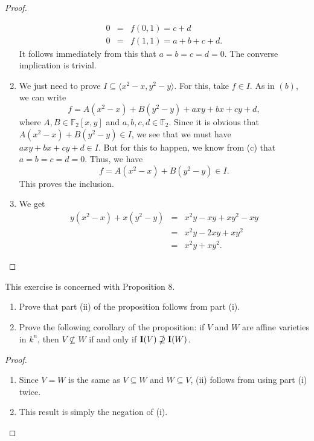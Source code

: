 \begin{proof}
\begin{enumerate}
\begin{eqnarray*}
            0 & = & f(0,1) = c+d\\
            0 & = & f(1,1) = a+b+c+d.
        \end{eqnarray*}
        It follows immediately from this that $a=b=c=d=0$. The converse implication is trivial.
        \item We just need to prove $I\subseteq \langle x^2 - x, y^2 - y\rangle$. For this, take $f\in I$. As in $(b)$, we can write
        $$f = A(x^2 - x) + B(y^2 - y) + axy + bx + cy + d,$$
        where $A,B\in \mathbb{F}_2[x,y]$ and $a,b,c,d\in \mathbb{F}_2$. Since it is obvious that $A(x^2 -x) + B(y^2 - y)\in I$, we see that we must have $axy + bx + cy + d\in I$. But for this to happen, we know from (c) that $a=b=c=d=0$. Thus, we have
        $$f = A(x^2 - x) + B(y^2 - y)\in I.$$
        This proves the inclusion.
        \item We get
        \begin{eqnarray*}
            y(x^2 - x) + x(y^2 - y)
            & = & x^2 y - xy + xy^2 - xy\\
            & = & x^2 y - 2xy + xy^2\\
            & = & x^2 y + xy^2.
        \end{eqnarray*}
    \end{enumerate}
\end{proof}

\begin{exercise}{14}
This exercise is concerned with Proposition 8.
\begin{enumerate}
    \item Prove that part (ii) of the proposition follows from part (i).
    \item Prove the following corollary of the proposition: if $V$ and $W$ are affine varieties in $k^n$, then $V\nsubseteq W$ if and only if $\mathbf{I}(V)\nsupseteq\mathbf{I}(W)$.
\end{enumerate}
\end{exercise}
\begin{proof}
\begin{enumerate}
    \item Since $V=W$ is the same as $V\subseteq W$ and $W\subseteq V$, (ii) follows from using part (i) twice.
    \item This result is simply the negation of (i).
\end{enumerate}
\end{proof}

